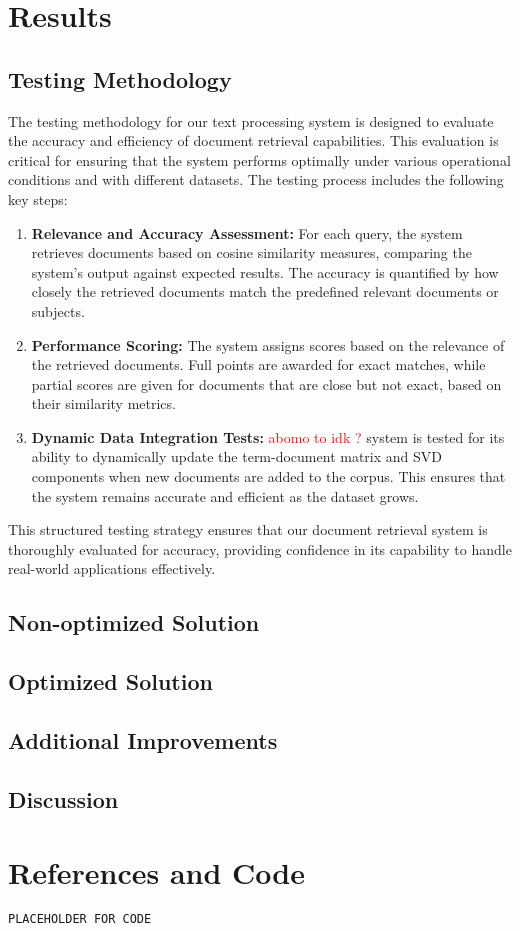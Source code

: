 \documentclass[12pt,a4paper]{article}
\begin{document}
\newpage
\section{Results}

\subsection{Testing Methodology}
The testing methodology for our text processing system is designed to evaluate the accuracy and efficiency of document retrieval capabilities. This evaluation is critical for ensuring that the system performs optimally under various operational conditions and with different datasets. The testing process includes the following key steps:

\begin{enumerate}
    \item \textbf{Relevance and Accuracy Assessment:} For each query, the system retrieves documents based on cosine similarity measures, comparing the system’s output against expected results. The accuracy is quantified by how closely the retrieved documents match the predefined relevant documents or subjects.

    \item \textbf{Performance Scoring:} The system assigns scores based on the relevance of the retrieved documents. Full points are awarded for exact matches, while partial scores are given for documents that are close but not exact, based on their similarity metrics.

    \item \textbf{Dynamic Data Integration Tests:} \textcolor{red}{abomo to idk ?} system is tested for its ability to dynamically update the term-document matrix and SVD components when new documents are added to the corpus. This ensures that the system remains accurate and efficient as the dataset grows.
\end{enumerate}

\noindent This structured testing strategy ensures that our document retrieval system is thoroughly evaluated for accuracy, providing confidence in its capability to handle real-world applications effectively.


\subsection{Non-optimized Solution}



\subsection{Optimized Solution}

\subsection{Additional Improvements}

\newpage
\subsection{Discussion}

\newpage
\section{References and Code}

\begin{lstlisting}[style=Matlab-Pyglike]
PLACEHOLDER FOR CODE
\end{lstlisting}
\end{document}
